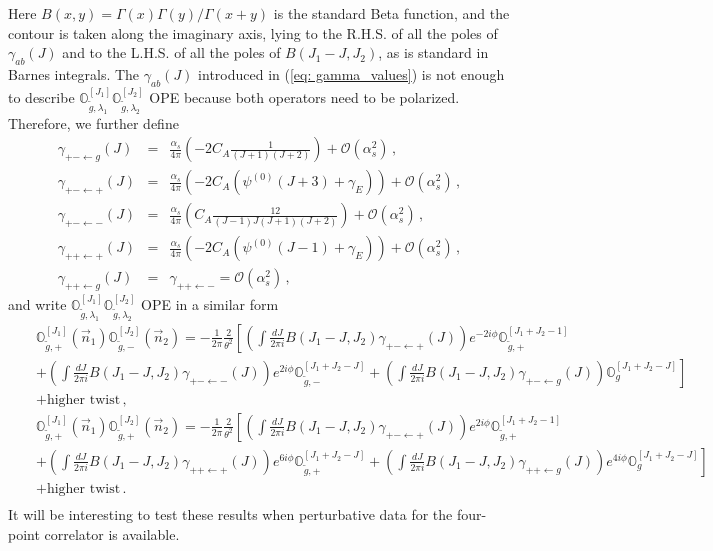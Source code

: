 \documentclass[letterpaper,11pt]{article}
\def\bea{\begin{eqnarray}}
\def\eea{\end{eqnarray}}
\begin{document}
Here $B(x,y) = \Gamma(x) \Gamma(y)/\Gamma(x+y)$ is the standard Beta function, and the contour is taken along the imaginary axis, lying to the R.H.S. of all the poles of $\gamma_{ab}(J)$ and to the L.H.S. of all the poles of $B(J_1 -J,J_2)$, as is standard in Barnes integrals. 
The $\gamma_{ab}(J)$ introduced in (\ref{eq: gamma_values}) is not enough to describe $\mathbb{O}_{\tilde{g},\lambda_1}^{[J_1]}\mathbb{O}_{\tilde{g},\lambda_2}^{[J_2]}$ OPE because both operators need to be polarized. Therefore, we further define
\bea
\gamma_{+-\leftarrow g}(J)&=&\frac{\alpha_s}{4\pi}\left(-2C_A \frac{1}{(J+1)(J+2)}\right)+\mathcal{O}(\alpha_s^2)\,,\nonumber\\
\gamma_{+-\leftarrow +}(J)&=&\frac{\alpha_s}{4\pi} \left(-2C_A(\psi^{(0)}(J+3)+\gamma_E)\right)+\mathcal{O}(\alpha_s^2)\,,\nonumber\\
\gamma_{+-\leftarrow -}(J)&=&\frac{\alpha_s}{4\pi}\left( C_A \frac{12}{(J-1) J (J+1) (J+2)}\right)+\mathcal{O}(\alpha_s^2)\,,\nonumber\\
\gamma_{++\leftarrow +}(J)&=&\frac{\alpha_s}{4\pi}\left(-2 C_A(\psi^{(0)}(J-1)+\gamma_E)  \right)+\mathcal{O}(\alpha_s^2)\,,\nonumber\\
\gamma_{++\leftarrow g}(J)&=&\gamma_{++\leftarrow -}=\mathcal{O}(\alpha_s^2)\,,\nonumber
\eea
and write $\mathbb{O}_{\tilde{g},\lambda_1}^{[J_1]}\mathbb{O}_{\tilde{g},\lambda_2}^{[J_2]}$ OPE in a similar form
\bea
& &\mathbb{O}_{\tilde{g},+}^{[J_1]}(\vec{n}_1)\mathbb{O}_{\tilde{g},-}^{[J_2]}(\vec{n}_2)
= -\frac{1}{2\pi} \frac{2}{\theta^2}\left[ \left(\int \frac{dJ}{2\pi i} B(J_1-J,J_2) \gamma_{+-\leftarrow +}(J)\right) e^{-2i\phi} \mathbb{O}_{\tilde{g},+}^{[J_1+J_2-1]}   \right.\nonumber\\
& & \left. +\left(\int \frac{dJ}{2\pi i} B(J_1-J,J_2)\gamma_{+-\leftarrow -}(J) \right)e^{2i\phi}\mathbb{O}_{\tilde{g},-}^{[J_1+J_2-J]} +\left(\int \frac{dJ}{2\pi i}B(J_1-J,J_2)\gamma_{+-\leftarrow g}(J)\right)\mathbb{O}_{g}^{[J_1+J_2-J]}\right] \nonumber\\
& & +\text{higher twist}\,, \nonumber\\
& &\mathbb{O}_{\tilde{g},+}^{[J_1]}(\vec{n}_1)\mathbb{O}_{\tilde{g},+}^{[J_2]}(\vec{n}_2)
= -\frac{1}{2\pi} \frac{2}{\theta^2}\left[ \left(\int \frac{dJ}{2\pi i} B(J_1-J,J_2) \gamma_{+-\leftarrow +}(J)\right) e^{2i\phi} \mathbb{O}_{\tilde{g},+}^{[J_1+J_2-1]}   \right.\nonumber\\
& & \left. +\left(\int \frac{dJ}{2\pi i} B(J_1-J,J_2)\gamma_{++\leftarrow +}(J) \right)e^{6i\phi}\mathbb{O}_{\tilde{g},+}^{[J_1+J_2-J]} +\left(\int \frac{dJ}{2\pi i}B(J_1-J,J_2)\gamma_{++\leftarrow g}(J)\right)e^{4i\phi}\mathbb{O}_{g}^{[J_1+J_2-J]}\right]\nonumber \\
& & +\text{higher twist}\,. \nonumber\\
\eea
It will be interesting to test these results when perturbative data for the four-point correlator is available.
\end{document}
